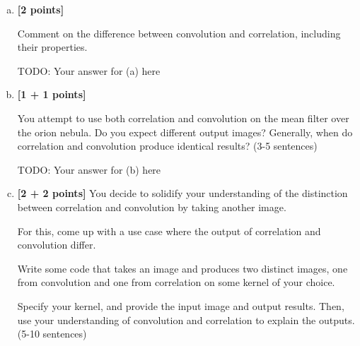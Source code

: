\begin{enumerate}[(a)]
    \item \textbf{[2 points]} 
    \begin{tcolorbox}[colback=orange!5!white,colframe=orange!75!black]
    Comment on the difference between convolution and correlation, including their properties. 
    \end{tcolorbox}
    
    \begin{tcolorbox}[colback=white!5!white,colframe=green!75!black]
    \begin{mdframed}
        TODO: Your answer for (a) here
    \end{mdframed}
\end{tcolorbox}
    

    \item \textbf{[1 + 1 points]} 
    \begin{tcolorbox}[colback=orange!5!white,colframe=orange!75!black]
    You attempt to use both correlation and convolution on the mean filter over the orion nebula. Do you expect different output images? Generally, when do correlation and convolution produce identical results? (3-5 sentences)
    \end{tcolorbox}
    
    \begin{tcolorbox}[colback=white!5!white,colframe=green!75!black]
    \begin{mdframed}
        TODO: Your answer for (b) here
    \end{mdframed}
\end{tcolorbox}

    \item \textbf{[2 + 2 points]}
    You decide to solidify your understanding of the distinction between correlation and convolution by taking another image.
    
    \begin{tcolorbox}[colback=orange!5!white,colframe=orange!75!black]
    For this, come up with a use case where the output of correlation and convolution differ.
    
    Write some code that takes an image and produces two distinct images, one from convolution and one from correlation on some kernel of your choice. 
    
    Specify your kernel, and provide the input image and output results. Then, use your understanding of convolution and correlation to explain the outputs. (5-10 sentences)
    \end{tcolorbox}
    

\end{enumerate}
